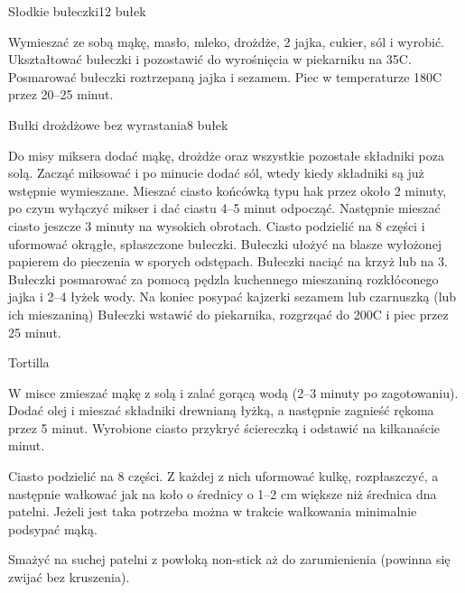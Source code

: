 \documentclass[a4paper,12pt]{article}
\begin{document}
\begin{recipe}{Słodkie bułeczki}{12 bułek}{}


Wymieszać ze sobą mąkę, masło, mleko, drożdże, 2 jajka, cukier, sól i wyrobić. 
Ukształtować bułeczki i pozostawić do wyrośnięcia w piekarniku na 35\0C.
Posmarować bułeczki roztrzepaną  jajka i sezamem.
Piec w temperaturze 180\0C przez 20--25 minut.
\freeform%


\end{recipe}

\begin{recipe}{Bułki drożdżowe bez wyrastania}{8 bułek}{}


Do misy miksera dodać mąkę, drożdże oraz wszystkie pozostałe składniki poza solą.
Zacząć miksować i po minucie dodać sól, wtedy kiedy składniki są już wstępnie wymieszane.
Mieszać ciasto końcówką typu hak przez około 2 minuty, po czym wyłączyć mikser i dać ciastu 4--5 minut odpocząć.
Następnie mieszać ciasto jeszcze 3 minuty na wysokich obrotach.
\freeform%
Ciasto podzielić na 8 części i uformować okrągłe, spłaszczone bułeczki.
Bułeczki ułożyć na blasze wyłożonej papierem do pieczenia w sporych odstępach.
Bułeczki naciąć na krzyż lub na 3.
Bułeczki posmarować za pomocą pędzla kuchennego mieszaniną rozkłóconego jajka i 2--4 łyżek wody.
Na koniec posypać kajzerki sezamem lub czarnuszką (lub ich mieszaniną)
Bułeczki wstawić do piekarnika, rozgrzqać do 200\0C i piec przez 25 minut.


\end{recipe}

\begin{recipe}{Tortilla}{}{}

W misce zmieszać mąkę z solą i zalać gorącą wodą (2--3 minuty po zagotowaniu).
Dodać olej i mieszać składniki drewnianą łyżką, a następnie zagnieść rękoma przez 5 minut.
Wyrobione ciasto przykryć ściereczką i odstawić na kilkanaście minut.

\freeform%
Ciasto podzielić na 8 części. Z każdej z nich uformować kulkę, rozpłaszczyć, a następnie wałkować jak na koło o średnicy o 1--2 cm większe niż średnica dna patelni. 
Jeżeli jest taka potrzeba można w trakcie wałkowania minimalnie podsypać mąką. 
 
Smażyć na suchej patelni z powłoką non-stick aż do zarumienienia (powinna się zwijać bez kruszenia).

\end{recipe}
\end{document}
